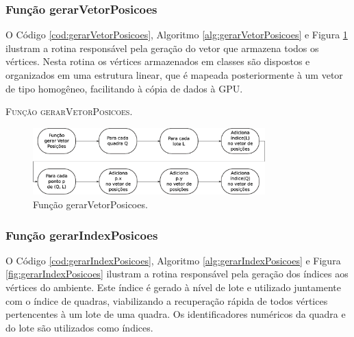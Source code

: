\newpage

\subsubsection{Função gerarVetorPosicoes}

O Código \ref{cod:gerarVetorPosicoes}, Algoritmo \ref{alg:gerarVetorPosicoes} e Figura \ref{fig:gerarVetorPosicoes} ilustram a rotina responsável pela geração do vetor que armazena todos os vértices. Nesta rotina os vértices armazenados em classes são dispostos e organizados em uma estrutura linear, que é mapeada posteriormente à um vetor de tipo homogêneo, facilitando à cópia de dados à GPU.



\begin{algorithm}[H]
   \SetAlgoLined   
   
   \caption{\textsc{Função gerarVetorPosicoes.}}
   \label{alg:gerarVetorPosicoes}
\end{algorithm}

\begin{figure}[H]
  \centering
  \includegraphics[width=0.8\textwidth]{Figuras/Simula/Fluxos/gerarVetorPosicoes.eps}
  \caption{Função gerarVetorPosicoes.}
  \label{fig:gerarVetorPosicoes}
\end{figure} 

\newpage

\subsubsection{Função gerarIndexPosicoes}

O Código \ref{cod:gerarIndexPosicoes}, Algoritmo \ref{alg:gerarIndexPosicoes} e Figura \ref{fig:gerarIndexPosicoes} ilustram a rotina responsável pela geração dos índices aos vértices do ambiente. Este índice é gerado à nível de lote e utilizado juntamente com o índice de quadras, viabilizando a recuperação rápida de todos vértices pertencentes à um lote de uma quadra. Os identificadores numéricos da quadra e do lote são utilizados como índices. 

